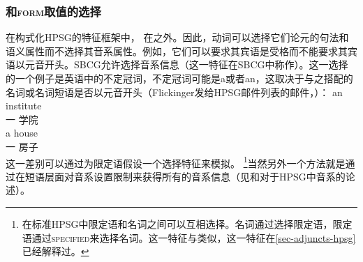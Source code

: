 \subsubsection{\phon 和\textsc{form}取值的选择}

在构式化HPSG的特征框架中， \phonvc 在\synsemc 之外。因此，动词可以选择它们论元的句法和语义属性而不选择其音系属性。例如，它们可以要求其宾语是受格而不能要求其宾语以元音开头。SBCG允许选择音系信息（这一特征在SBCG中称作\formc）。这一选择的一个例子是英语中的不定冠词，不定冠词可能是a或者an，这取决于与之搭配的名词或名词短语是否以元音开头（Flickinger发给HPSG邮件列表的邮件，）：
\eal
\ex 
\gll an institute\\
     一 学院\\
\ex 
\gll a  house\\
     一 房子\\
\zl
这一差别可以通过为限定语假设一个选择特征来模拟。 \footnote{%
  在标准HPSG中限定语和名词之间可以互相选择。名词通过\sprc 选择限定语，限定语通过\textsc{specified}来选择名词。这一特征与\modfc 类似，这一特征在\ref{sec-adjuncts-hpsg}已经解释过。
}当然另外一个方法就是通过在短语层面对音系设置限制来获得所有的音系信息（见\citealp{BK94b}和\citealp{Walther99a-u}对于HPSG中音系的论述）。

